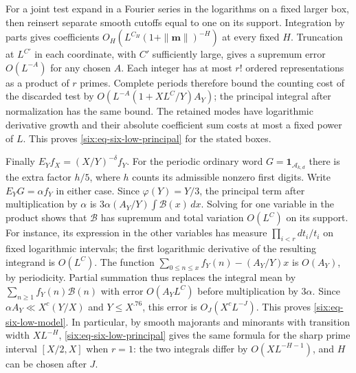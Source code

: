 \documentclass[11pt,a4paper]{article}
\theoremstyle{paperplain}
\numberwithin{equation}{section}
\begin{document}
For a joint test expand in a Fourier series in the logarithms on a
fixed larger box, then reinsert separate smooth cutoffs equal to one on
its support. Integration by parts gives coefficients
\(O_H(L^{C_H}(1+\|\boldsymbol m\|)^{-H})\) at every fixed \(H\).
Truncation at \(L^{C'}\) in each coordinate, with \(C'\) sufficiently
large, gives a supremum error \(O(L^{-A})\) for any chosen \(A\).
Each integer has at most \(r!\) ordered representations as a product
of \(r\) primes. Complete periods therefore bound the counting cost
of the discarded test by \(O(L^{-A}(1+XL^C/Y)A_Y)\); the principal
integral after normalization has the same bound. The retained modes
have logarithmic derivative growth and their absolute coefficient
sum costs at most a fixed power of \(L\). This proves
\eqref{six:eq-six-low-principal} for the stated boxes.

Finally \(E_Y f_X=(X/Y)^{-\delta} f_Y\). For the periodic ordinary
word \(G=\mathbf1_{\mathcal A_{k,d}}\) there is the extra factor
\(h/5\), where \(h\) counts its admissible nonzero first digits.
Write \(E_YG=\alpha f_Y\) in either case. Since
\(\varphi(Y)=Y/3\), the principal term after multiplication by
\(\alpha\) is \(3\alpha(A_Y/Y)\int\mathcal B(x)\,dx\).
Solving for one variable in the product shows that \(\mathcal B\)
has supremum and total variation \(O(L^C)\) on its support. For
instance, its expression in the other variables has measure
\(\prod_{i<r}dt_i/t_i\) on fixed logarithmic intervals; the first
logarithmic derivative of the resulting integrand is \(O(L^C)\).
The function
\(\sum_{0\le n\le x}f_Y(n)-(A_Y/Y)x\) is \(O(A_Y)\), by
periodicity. Partial summation thus replaces the integral mean by
\(\sum_{n\ge1} f_Y(n)\mathcal B(n)\) with error \(O(A_Y L^C)\)
before multiplication by \(3\alpha\). Since
\(\alpha A_Y\ll X^c(Y/X)\) and \(Y\le X^{.76}\), this error is
\(O_J(X^c L^{-J})\). This proves \eqref{six:eq-six-low-model}.
In particular, by smooth majorants and minorants with transition
width \(XL^{-H}\), \eqref{six:eq-six-low-principal} gives the same
formula for the sharp prime interval \([X/2,X]\) when \(r=1\):
the two integrals differ by \(O(XL^{-H-1})\), and \(H\) can be
chosen after \(J\).
\end{document}
